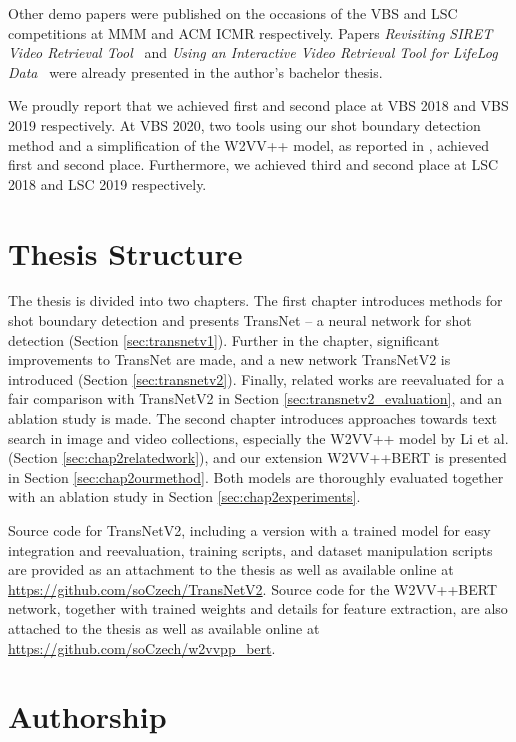 Other demo papers \cite{LokocVBS2019_Nasnet,LokocLSC2019} were published on the occasions of the VBS and LSC competitions at MMM and ACM ICMR respectively. Papers \textit{Revisiting SIRET Video Retrieval Tool}~\cite{LokocVBS2018} and \textit{Using an Interactive Video Retrieval Tool for LifeLog Data}~\cite{LokocLSC2018} were already presented in the author's bachelor thesis.

We proudly report that we achieved first and second place at VBS 2018 and VBS 2019 respectively. At VBS 2020, two tools \cite{LokocVBS2020_VIRET,SOMHunterVBS2020} using our shot boundary detection method and a simplification of the W2VV++ model, as reported in \cite{W2VVppMM2020}, achieved first and second place. Furthermore, we achieved third and second place at LSC 2018 and LSC 2019 respectively.


\section*{Thesis Structure}

The thesis is divided into two chapters. The first chapter introduces methods for shot boundary detection and presents TransNet -- a neural network for shot detection (Section \ref{sec:transnetv1}). Further in the chapter, significant improvements to TransNet are made, and a new network TransNetV2 is introduced (Section \ref{sec:transnetv2}). Finally, related works are reevaluated for a fair comparison with TransNetV2 in Section \ref{sec:transnetv2_evaluation}, and an ablation study is made. The second chapter introduces approaches towards text search in image and video collections, especially the W2VV++ model by Li et al. \cite{XirongW2VVpp} (Section \ref{sec:chap2relatedwork}), and our extension W2VV++BERT is presented in Section \ref{sec:chap2ourmethod}. Both models are thoroughly evaluated together with an ablation study in Section \ref{sec:chap2experiments}.

Source code for TransNetV2, including a version with a trained model for easy integration and reevaluation, training scripts, and dataset manipulation scripts are provided as an attachment to the thesis as well as available online at \url{https://github.com/soCzech/TransNetV2}. Source code for the W2VV++BERT network, together with trained weights and details for feature extraction, are also attached to the thesis as well as available online at \url{https://github.com/soCzech/w2vvpp_bert}.


\section*{Authorship}

